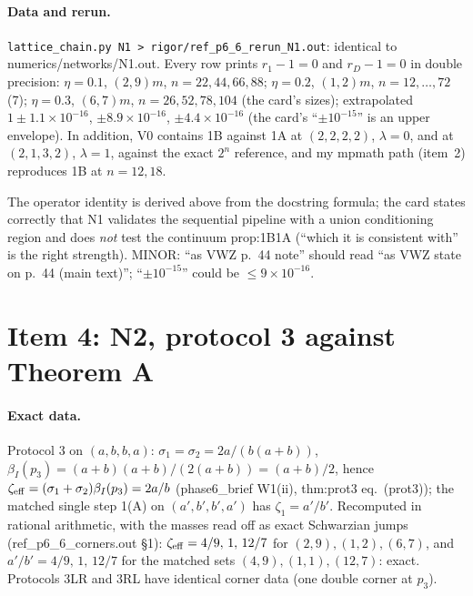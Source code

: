 \documentclass[11pt]{article}
\begin{document}
\paragraph{Data and rerun.} \texttt{lattice\_chain.py N1 > rigor/ref\_p6\_6\_rerun\_N1.out}: identical to
numerics/networks/N1.out. Every row prints $r_1-1=0$ and $r_D-1=0$ in double precision: $\eta=0.1$, $(2,9)m$,
$n=22,44,66,88$; $\eta=0.2$, $(1,2)m$, $n=12,\dots,72$ (7); $\eta=0.3$, $(6,7)m$, $n=26,52,78,104$ (the card's
sizes); extrapolated $1\pm1.1\times10^{-16}$, $\pm8.9\times10^{-16}$, $\pm4.4\times10^{-16}$ (the card's
``$\pm10^{-15}$'' is an upper envelope). In addition, V0 contains 1B against 1A at $(2,2,2,2)$, $\lambda=0$, and at
$(2,1,3,2)$, $\lambda=1$, against the exact $2^n$ reference, and my mpmath path (item~2) reproduces 1B at $n=12,18$.
\begin{verdictok}
The operator identity is derived above from the docstring formula; the card states correctly that N1 validates the
sequential pipeline with a union conditioning region and does \emph{not} test the continuum prop:1B1A (``which it is
consistent with'' is the right strength). MINOR: ``as VWZ p.~44 note'' should read ``as VWZ state on p.~44 (main
text)''; ``$\pm10^{-15}$'' could be $\le9\times10^{-16}$.
\end{verdictok}

\section{Item 4: N2, protocol 3 against Theorem A}\label{sec:i4}
\paragraph{Exact data.} Protocol 3 on $(a,b,b,a)$: $\sigma_1=\sigma_2=2a/(b(a+b))$, $\beta_I(p_3)=(a+b)(a+b)/(2(a+b))=(a+b)/2$,
hence $\zeta_{\rm eff}=(\sigma_1+\sigma_2)\beta_I(p_3)=2a/b$ (phase6\_brief W1(ii), thm:prot3 eq.~(prot3)); the matched
single step 1(A) on $(a',b',b',a')$ has $\zeta_1=a'/b'$. Recomputed in rational arithmetic, with the masses read
off as exact Schwarzian jumps (ref\_p6\_6\_corners.out \S1): $\zeta_{\rm eff}=4/9,\,1,\,12/7$ for $(2,9),(1,2),(6,7)$,
and $a'/b'=4/9,\,1,\,12/7$ for the matched sets $(4,9),(1,1),(12,7)$: exact. Protocols 3LR and 3RL have identical
corner data (one double corner at $p_3$).
\end{document}
